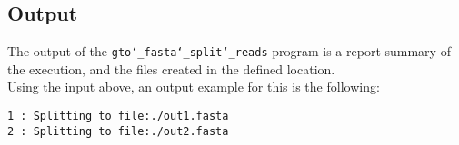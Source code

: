 \subsection*{Output}
The output of the \texttt{gto\char`_fasta\char`_split\char`_reads} program is a report summary of the execution, and the files created in the defined location.\\ 
Using the input above, an output example for this is the following:
\begin{lstlisting}
1 : Splitting to file:./out1.fasta
2 : Splitting to file:./out2.fasta
\end{lstlisting}
